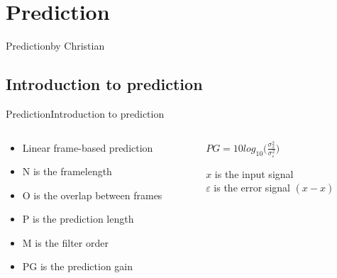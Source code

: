 \section{Prediction}
\begin{frame}{Prediction}{by Christian}
\end{frame}

\subsection{Introduction to prediction}
\begin{frame}{Prediction}{Introduction to prediction}
	\begin{columns}
		\begin{column}{0.5\textwidth}
			\begin{itemize}
				\item Linear frame-based prediction
				\item N is the framelength
				\item O is the overlap between frames
				\item P is the prediction length
				\item M is the filter order
				\item PG is the prediction gain
			\end{itemize}
		\end{column}
		\begin{column}{0.5\textwidth} 
			$PG = 10 log_{10}\bigg(\frac{\sigma^2_x}{\sigma^2_\varepsilon}\bigg)	$
			
			$x$ is the input signal\\
			$\varepsilon$ is the error signal $(x-\hat{x})$
		\end{column}
	\end{columns}
\end{frame}

